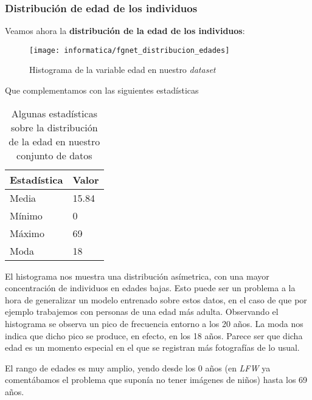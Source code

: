 \subsubsection{Distribución de edad de los individuos} \label{isubsubs:fgnet_dist_edades}

Veamos ahora la \textbf{distribución de la edad de los individuos}:

\begin{figure}[H]
    \centering
    \texttt{[image: informatica/fgnet\_distribucion\_edades]}
    \caption{Histograma de la variable edad en nuestro \textit{dataset}}
    \label{img:fgnet_histograma_edad}
\end{figure}

Que complementamos con las siguientes estadísticas

\begin{table}[H]
\centering
\begin{tabular}{|l|l|}
    \hline
    \textbf{Estadística} & \textbf{Valor} \\
    \hline

    Media  & 15.84 \\
    Mínimo & 0 \\
    Máximo & 69 \\
    Moda   & 18 \\

    \hline

\end{tabular}

    \caption{Algunas estadísticas sobre la distribución de la edad en nuestro conjunto de datos}
    \label{table:fgnet_estadisticas_edad}
\end{table}

El histograma  nos muestra una distribución asímetrica, con una mayor concentración de individuos en edades bajas. Esto puede ser un problema a la hora de generalizar un modelo entrenado sobre estos datos, en el caso de que por ejemplo trabajemos con personas de una edad más adulta. Observando el histograma se observa un pico de frecuencia entorno a los 20 años. La moda nos indica que dicho pico se produce, en efecto, en los 18 años. Parece ser que dicha edad es un momento especial en el que se registran más fotografías de lo usual.

El rango de edades es muy amplio, yendo desde los 0 años (en \textit{LFW} ya comentábamos el problema que suponía no tener imágenes de niños) hasta los 69 años.

